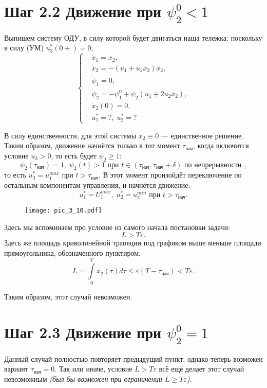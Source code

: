 \section*{Шаг 2.2 Движение при $\psi_2^0 < 1$}

Выпишем систему ОДУ, в силу которой будет двигаться наша тележка: поскольку в силу (УМ) $u_3^*(0+) = 0$,
$$
    \left\{
    \begin{aligned}
        & \dot{x}_1 = x_2, \\
        & \dot{x}_2 = - (u_1 + u_2 x_2) x_2, \\
        & \dot{\psi}_1 = 0, \\
        & \dot{\psi}_2 = - \psi_1^0 + \psi_2 (u_1 + 2 u_2 x_2), \\
        & \dot{x}_2(0) = 0, \\
        & u_1^* = ?, \; u_2^* = ?
    \end{aligned}
    \right.
$$

В силу единственности, для этой системы $x_2 \equiv 0$ --- единственное решение. Таким образом, движение начнётся только в тот момент $\tau_{\text{нач}}$, когда включится условие $u_3 >0$, то есть будет $\psi_2 \geqslant 1$:
$$
    \psi_2(\tau_{\text{нач}}) = 1, \; \psi_2(t) > 1 \text{ при } t \in (\tau_{\text{нач}}, \tau_{\text{нач}} + \delta) \text{ по непрерывности },
$$
то есть $u_3^* = u_1^{max}$ при $t > \tau_{\text{нач}}$. В этот момент произойдёт переключение по остальным компонентам управления, и начнётся движение:
$$
    u_1^* = U_1^{max}, \; u_2^* = u_2^{min} \text{ при } t > \tau_{\text{нач}}.
$$

\begin{figure}[H]
    \centering
    \texttt{[image: pic\_3\_10.pdf]}
\end{figure}

Здесь мы вспоминаем про условие из самого начала постановки задачи:
$$
    L > T\varepsilon.
$$
Здесь же площадь криволинейной трапеции под графиком выше меньше площади прямоугольника, обозначенного пунктиром:
$$
    L = \int\limits_0^T x_2(\tau) d\tau \leqslant \varepsilon (T - \tau_{\text{нач}}) < T\varepsilon.
$$

Таким образом, этот случай невозможен.

\section*{Шаг 2.3 Движение при $\psi_2^0 = 1$}
Данный случай полностью повторяет предыдущий пункт, однако теперь возможен вариант $\tau_{\text{нач}} = 0$. Так или иначе, условие $L > T \varepsilon$ всё ещё делает этот случай невозможным \textit{(был бы возможен при ограничении $L \geqslant T \varepsilon$)}.

